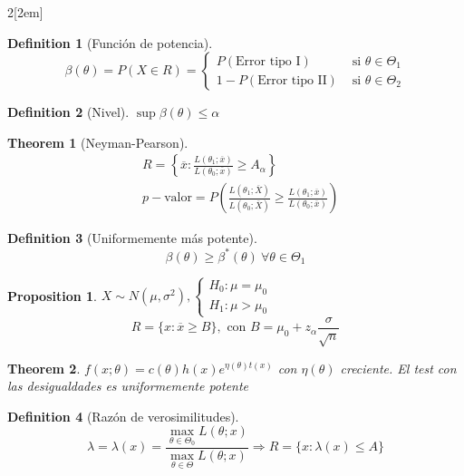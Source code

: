 \documentclass[leqno]{article}
\newtheorem*{theorem}{Theorem}
\newtheorem*{proposition}{Proposition}
\newtheorem*{definition}{Definition}
\begin{document}
\begin{multicols}{2}[\columnsep2em]
\begin{definition}[Función de potencia]
\[
\beta (\theta ) = P(X\in R) = \begin{cases}
  P(\text{Error tipo I}) & \text{ si } \theta \in \Theta_1 \\
  1-P(\text{Error tipo II}) & \text{ si } \theta \in \Theta_2 
\end{cases}
\] 
\end{definition}

\begin{definition}[Nivel] $\sup \beta (\theta )\le \alpha $
\end{definition}

\begin{theorem}[Neyman-Pearson]
\begin{align*}
  & R = \left\{ \overline{x} : \frac{L(\theta _1;\overline{x})}{L(\theta _0;\overline{x})}\ge A_\alpha  \right\}\\
  & p-\text{valor} = P\left( \frac{L(\theta _1;\overline{X})}{L(\theta _0; \overline{X})}\ge \frac{L(\theta _1;\overline{x})}{L(\theta _0;\overline{x})} \right) 
\end{align*}

\end{theorem}

\begin{definition}[Uniformemente más potente]
\[\beta (\theta )\ge \beta ^*(\theta) \ \forall \theta \in \Theta_1\]
\end{definition}

\begin{proposition}
$X \sim N(\mu, \sigma ^2), \begin{cases}
  H_0: \mu=\mu_0\\
  H_1:\mu>\mu_0
\end{cases}$ 
\[
  R = \{x: \overline{x}\ge B\}, \text{ con } B = \mu_0+z_\alpha \frac{\sigma}{\sqrt{n}}
\] 
\end{proposition}

\begin{theorem} $f(x;\theta ) = c(\theta )h(x)e^{\eta(\theta )t(x)}$ con $\eta(\theta )$ creciente.
El test con las desigualdades es uniformemente potente
\end{theorem}

\begin{definition}[Razón de verosimilitudes]
\[
  \lambda = \lambda(x) = \frac{\max_{\theta \in \Theta _0 }L(\theta ;x)}{\max_{\theta \in \Theta}L(\theta ;x)} \Rightarrow R = \{x:\lambda(x)\le A\}
\] 
\end{definition}


\end{multicols}
\end{document}
